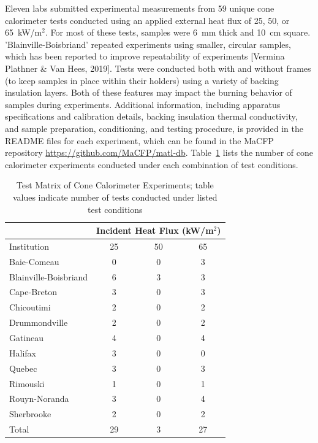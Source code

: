 \documentclass{book}
\begin{document}
Eleven labs submitted experimental measurements from 59 unique cone calorimeter tests conducted using an applied external heat flux of 25, 50, or 65~kW/m$^2$. For most of these tests, samples were 6~mm thick and 10~cm square. 'Blainville-Boisbriand' repeated experiments using smaller, circular samples, which has been reported to improve repeatability of experiments [Vermina Plathner \& Van Hees, 2019]. Tests were conducted both with and without frames (to keep samples in place within their holders) using a variety of backing insulation layers. Both of these features may impact the burning behavior of samples during experiments. Additional information, including apparatus specifications and calibration details, backing insulation thermal conductivity, and sample preparation, conditioning, and testing procedure, is provided in the README files for each experiment, which can be found in the MaCFP repository \href{https://github.com/MaCFP/matl-db}{https://github.com/MaCFP/matl-db}. Table~\ref{Table_6} lists the number of cone calorimeter experiments conducted under each combination of test conditions.

\begin{table}
\caption{Test Matrix of Cone Calorimeter Experiments; table values indicate number of tests conducted under listed test conditions}
\label{Table_6}
\begin{center}
\begin{tabular}{lccc}
                        & \multicolumn{3}{c}{Incident Heat Flux (kW/m$^2$)} \\ \hline
Institution             & 25 & 50 & 65       \\ \hline
Baie-Comeau             & 0     & 0     & 3  \\
Blainville-Boisbriand   & 6     & 3     & 3  \\
Cape-Breton             & 3     & 0     & 3  \\
Chicoutimi              & 2     & 0     & 2  \\
Drummondville           & 2     & 0     & 2  \\
Gatineau                & 4     & 0     & 4  \\
Halifax                 & 3     & 0     & 0  \\
Quebec                  & 3     & 0     & 3  \\
Rimouski                & 1     & 0     & 1  \\
Rouyn-Noranda           & 3     & 0     & 4  \\
Sherbrooke              & 2     & 0     & 2  \\ \hline
Total                   & 29    & 3     & 27 \\ \hline
\end{tabular}
\end{center}
\end{table}
\end{document}
